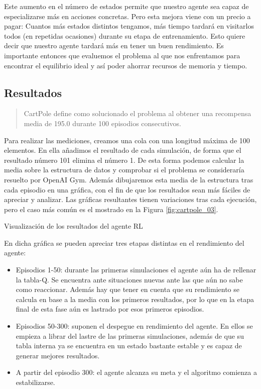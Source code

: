 Este aumento en el número de estados permite que nuestro agente sea capaz de especializarse más en acciones concretas. Pero esta mejora viene con un precio a pagar: Cuantos más estados distintos tengamos, más tiempo tardará en visitarlos todos (en repetidas ocasiones) durante su etapa de entrenamiento. Esto quiere decir que nuestro agente tardará más en tener un buen rendimiento. Es importante entonces que evaluemos el problema al que nos enfrentamos para encontrar el equilibrio ideal y así poder ahorrar recursos de memoria y tiempo.

\subsection{Resultados}
\begin{quote}
    CartPole define como solucionado el problema al obtener una recompensa media de 195.0 durante 100 episodios consecutivos.
\end{quote}

Para realizar las mediciones, creamos una cola con una longitud máxima de 100 elementos. En ella añadimos el resultado de cada simulación, de forma que el resultado número 101 elimina el número 1. De esta forma podemos calcular la media sobre la estructura de datos y comprobar si el problema se consideraría resuelto por OpenAI Gym. Además dibujaremos esta media de la estructura tras cada episodio en una gráfica, con el fin de que los resultados sean más fáciles de apreciar y analizar. Las gráficas resultantes tienen variaciones tras cada ejecución, pero el caso más común es el mostrado en la Figura \ref{fig:cartpole_03}.

%
       {Visualización de los resultados del agente RL}

En dicha gráfica se pueden apreciar tres etapas distintas en el rendimiento del agente:
\begin{itemize}
    \item Episodios 1-50: durante las primeras simulaciones el agente aún ha de rellenar la tabla-Q. Se encuentra ante situaciones nuevas ante las que aún no sabe como reaccionar. Además hay que tener en cuenta que su rendimiento se calcula en base a la media con los primeros resultados, por lo que en la etapa final de esta fase aún es lastrado por esos primeros episodios.
    \item Episodios 50-300: suponen el despegue en rendimiento del agente. En ellos se empieza a librar del lastre de las primeras simulaciones, además de que su tabla interna ya se encuentra en un estado bastante estable y es capaz de generar mejores resultados.
    \item A partir del episodio 300: el agente alcanza su meta y el algoritmo comienza a estabilizarse.
\end{itemize}

